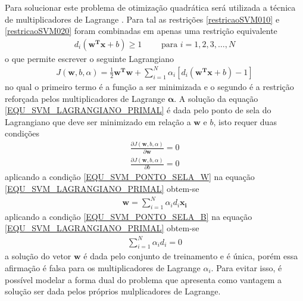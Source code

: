 \noindent
Para solucionar este problema de otimização quadrática será utilizada a técnica de multiplicadores de Lagrange \cite{Stewart2013}. Para tal as restrições \eqref{restricaoSVM010} e \eqref{restricaoSVM020} foram combinadas em apenas uma restrição equivalente
\begin{align}
d_{i}(\mathbf{w^{T}}\mathbf{x} + b )  \geq 1  \qquad \textrm{ para } i = 1, 2, 3, \ldots, N \label{EQU_SVM_RESTRICAO_CONJUNTA}
\end{align}
o que permite escrever o seguinte Lagrangiano
\begin{align}
J(\mathbf{w}, b, \alpha) = \frac{1}{2}\mathbf{w^{T}}\mathbf{w} + \sum\limits_{i=1}^{N} \alpha_{i}[d_{i}(\mathbf{w^{T}}\mathbf{x} + b) - 1] \label{EQU_SVM_LAGRANGIANO_PRIMAL}
\end{align}
no qual o primeiro termo é a função a ser minimizada e o segundo é a restrição reforçada pelos multiplicadores de Lagrange \(\mathbf{\alpha}\). A solução da equação \eqref{EQU_SVM_LAGRANGIANO_PRIMAL} é dada pelo ponto de sela do Lagrangiano que deve ser minimizado em relação a \(\mathbf{w}\) e \(b\), isto requer duas condições
\begin{align}
 \frac{\partial J(\mathbf{w}, b, \alpha)}{\partial \mathbf{w}} = 0	\label{EQU_SVM_PONTO_SELA_W}\\
 \frac{\partial J(\mathbf{w}, b, \alpha)}{\partial b} = 0  	\label{EQU_SVM_PONTO_SELA_B}
\end{align}
aplicando a condição \eqref{EQU_SVM_PONTO_SELA_W} na equação \eqref{EQU_SVM_LAGRANGIANO_PRIMAL} obtem-se 
\begin{align}
\mathbf{w} = \sum\limits_{i=1}^{N} \alpha_{i}d_{i}\mathbf{x_{i}}  \label{EQU_SVM_PONTO_SELA_W_RESTRICAO_OBTIDA}
\end{align}
aplicando a condição \eqref{EQU_SVM_PONTO_SELA_B} na equação \eqref{EQU_SVM_LAGRANGIANO_PRIMAL} obtem-se 
\begin{align}
\sum\limits_{i=1}^{N} \alpha_{i}d_{i} = 0 \label{EQU_SVM_PONTO_SELA_B_RESTRICAO_OBTIDA}
\end{align}
a solução do vetor \(\mathbf{w}\) é dada pelo conjunto de treinamento e é única, porém essa afirmação é falsa para os multiplicadores de Lagrange \(\alpha_{i}\). Para evitar isso, é possível modelar a forma dual do problema que apresenta como vantagem a solução ser dada pelos próprios mulplicadores de Lagrange.

